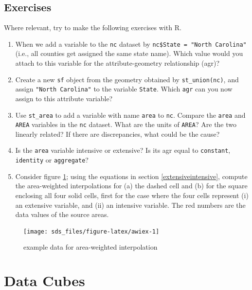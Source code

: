 \documentclass[]{book}
\providecommand{\tightlist}{%
  \setlength{\itemsep}{0pt}\setlength{\parskip}{0pt}}
\begin{document}
\hypertarget{exercises-4}{%
\section{Exercises}\label{exercises-4}}

Where relevant, try to make the following exercises with R.

\begin{enumerate}
\def\labelenumi{\arabic{enumi}.}
\tightlist
\item
  When we add a variable to the \texttt{nc} dataset by \texttt{nc\$State\ =\ "North\ Carolina"} (i.e., all counties get assigned the same state
  name). Which value would you attach to this variable for the
  attribute-geometry relationship (agr)?
\item
  Create a new \texttt{sf} object from the geometry obtained by
  \texttt{st\_union(nc)}, and assign \texttt{"North\ Carolina"} to the variable
  \texttt{State}. Which \texttt{agr} can you now assign to this attribute variable?
\item
  Use \texttt{st\_area} to add a variable with name \texttt{area} to \texttt{nc}. Compare
  the \texttt{area} and \texttt{AREA} variables in the \texttt{nc} dataset. What are
  the units of \texttt{AREA}? Are the two linearly related? If there are
  discrepancies, what could be the cause?
\item
  Is the \texttt{area} variable intensive or extensive? Is its agr equal to
  \texttt{constant}, \texttt{identity} or \texttt{aggregate}?
\item
  Consider figure \ref{fig:awiex}; using the equations in section
  \ref{extensiveintensive}, compute the area-weighted interpolations
  for (a) the dashed cell and (b) for the square enclosing all four solid
  cells, first for the case where the four cells represent (i) an extensive
  variable, and (ii) an intensive variable. The red numbers are the
  data values of the source areas.
\end{enumerate}

\begin{figure}

{\centering \texttt{[image: sds\_files/figure-latex/awiex-1]} 

}

\caption{example data for area-weighted interpolation}\label{fig:awiex}
\end{figure}

\hypertarget{datacube}{%
\chapter{Data Cubes}\label{datacube}}
\end{document}
